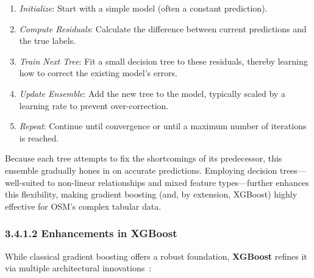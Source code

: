 \documentclass[
    13pt, %
    a4paper, %
    listof=totoc, %
    bibliography=totoc, %
    index=totoc, %
    headsepline
]{scrreprt}
\begin{document}
\begin{enumerate}
    \item \emph{Initialize}: Start with a simple model (often a constant prediction).
    \item \emph{Compute Residuals}: Calculate the difference between current predictions and the true labels.
    \item \emph{Train Next Tree}: Fit a small decision tree to these residuals, thereby learning how to correct the existing model’s errors.
    \item \emph{Update Ensemble}: Add the new tree to the model, typically scaled by a learning rate to prevent over-correction.
    \item \emph{Repeat}: Continue until convergence or until a maximum number of iterations is reached.
\end{enumerate}

\noindent
Because each tree attempts to fix the shortcomings of its predecessor, this ensemble gradually hones in on accurate predictions. Employing decision trees—well-suited to non-linear relationships and mixed feature types—further enhances this flexibility, making gradient boosting (and, by extension, XGBoost) highly effective for OSM’s complex tabular data.

\subsubsection{3.4.1.2 Enhancements in XGBoost}
\label{sec:xgboost_enhancements}

\noindent
While classical gradient boosting offers a robust foundation, \textbf{XGBoost} refines it via multiple architectural innovations~\cite{chen2016xgboost}:
\end{document}

